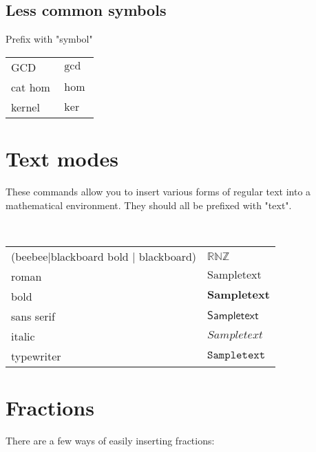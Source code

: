 \documentclass[12pt]{article}
\begin{document}
\subsection{Less common symbols}
Prefix with "symbol"

\begin{longtable}{ll}
GCD & $\gcd$ \\
cat hom & $\hom$ \\
kernel & $\ker$ \\
\end{longtable}

\section{Text modes}
These commands allow you to insert various forms of regular text into a mathematical environment. They should all be prefixed with "text".

\

\begin{longtable}{ l l}
(beebee|blackboard bold | blackboard) & $\mathbb{R N Z}$ \\
roman & $\mathrm{Sample text}$ \\
bold & $\mathbf{Sample text}$ \\
sans serif & $\mathsf{Sample text}$ \\
italic & $\mathit{Sample text}$ \\
typewriter & $\mathtt{Sample text}$ \\
\end{longtable}

\section{Fractions}
There are a few ways of easily inserting fractions:
\end{document}
